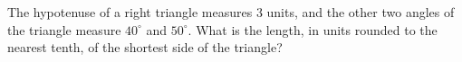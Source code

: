 The hypotenuse of a right triangle measures $3$ units, and the other two angles of the triangle measure $40^\circ$ and $50^\circ$. What is the length, in units rounded to the nearest tenth, of the shortest side of the triangle?
